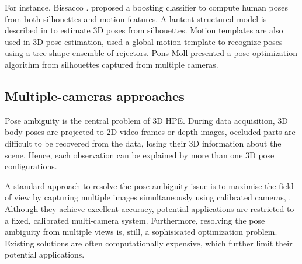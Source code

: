 
For instance, Bissacco \etal. \cite{Bissacco2007} proposed a boosting classifier to compute human poses from both silhouettes and motion features.  
A lantent structured model is described in \cite{Ionescu2011} to estimate 3D poses from silhouettes. 
Motion templates are also used in 3D pose estimation, \cite{Rogez2012} used a global motion template to recognize poses using a tree-shape ensemble of rejectors. 
Pons-Moll \etal \cite{Pons-Moll2011} presented a pose optimization algorithm from silhouettes captured from multiple cameras. 


\subsection{Multiple-cameras approaches} 

Pose ambiguity is the central problem of 3D HPE. 
During data acquisition, 3D body poses are projected to 2D video frames or depth images, occluded parts are difficult to be recovered from the data, losing their 3D information about the scene. Hence, each observation can be explained by more than one 3D pose configurations. 

A standard approach to resolve the pose ambiguity issue is to maximise the field of view by capturing multiple images simultaneously using calibrated cameras, \eg \cite{Pons-Moll2011, Sigal2012, Yao2012}.   
Although they achieve excellent accuracy, potential applications are restricted to a fixed, calibrated multi-camera system. 
Furthermore, resolving the pose ambiguity from multiple views is, still, a sophisicated optimization problem. 
Existing solutions are often computationally expensive, which further limit their potential applications.   

